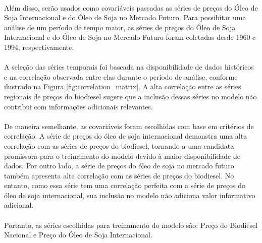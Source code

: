 \paragraph{} Além disso, serão usados como covariáveis passadas as séries de preços do Óleo de Soja Internacional e do Óleo de Soja no Mercado Futuro. Para possibitar uma análise de um período de tempo maior, as séries de preços do Óleo de Soja Internacional e do Óleo de Soja no Mercado Futuro foram coletadas desde 1960 e 1994, respectivamente.
\paragraph{} A seleção das séries temporais foi baseada na disponibilidade de dados históricos e na correlação observada entre elas durante o período de análise, conforme ilustrado na Figura \ref{fig:correlation_matrix}. A alta correlação entre as séries regionais de preços do biodiesel sugere que a inclusão dessas séries no modelo não contribui com informações adicionais relevantes.
\paragraph{} De maneira semelhante, as covariáveis foram escolhidas com base em critérios de correlação. A série de preços do óleo de soja internacional demonstra uma alta correlação com as séries de preços do biodiesel, tornando-a uma candidata promissora para o treinamento do modelo devido à maior disponibilidade de dados. Por outro lado, a série de preços do óleo de soja no mercado futuro também apresenta alta correlação com as séries de preços do biodiesel. No entanto, como essa série tem uma correlação perfeita com a série de preços do óleo de soja internacional, sua inclusão no modelo não adiciona valor informativo adicional.
\paragraph{} Portanto, as séries escolhidas para treinamento do modelo são: Preço do Biodiesel Nacional e Preço do Óleo de Soja Internacional.

